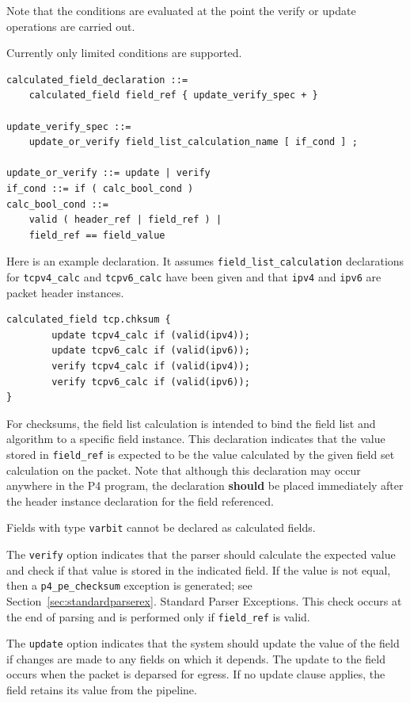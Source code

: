 \documentclass[12pt]{article}
\begin{document}
Note that the conditions are evaluated at the point the verify or
update operations are carried out.

Currently only limited conditions are supported.

\begin{lstlisting}[style=BNFstyle]
calculated_field_declaration ::=
    calculated_field field_ref { update_verify_spec + }

update_verify_spec ::=
    update_or_verify field_list_calculation_name [ if_cond ] ;

update_or_verify ::= update | verify
if_cond ::= if ( calc_bool_cond )
calc_bool_cond ::=
    valid ( header_ref | field_ref ) |
    field_ref == field_value
\end{lstlisting}

Here is an example declaration. It assumes \texttt{field_list_calculation} declarations 
for \texttt{tcpv4_calc} and \texttt{tcpv6_calc} have been given and that \texttt{ipv4} and \texttt{ipv6} are 
packet header instances.

\begin{lstlisting}[style=P4style]
calculated_field tcp.chksum {
        update tcpv4_calc if (valid(ipv4));
        update tcpv6_calc if (valid(ipv6));
        verify tcpv4_calc if (valid(ipv4));
        verify tcpv6_calc if (valid(ipv6));
}
\end{lstlisting}

For checksums, the field list calculation is intended to bind the field list 
and algorithm to a specific field instance. This declaration indicates that 
the value stored in \texttt{field_ref} is expected to be the value calculated by the 
given field set calculation on the packet. Note that although this declaration 
may occur anywhere in the P4 program, the declaration \textbf{should} be placed immediately 
after the header instance declaration for the field referenced.

Fields with type \texttt{varbit} cannot be declared as calculated fields.

The \texttt{verify} option indicates that the parser should calculate the expected 
value and check if that value is stored in the indicated field. If the value 
is not equal, then a \texttt{p4_pe_checksum} exception is generated; see Section~\ref{sec:standardparserex}. 
Standard Parser Exceptions. This check occurs at the end of parsing and is 
performed only if \texttt{field_ref} is valid.

The \texttt{update} option indicates that the system should update the value of the 
field if changes are made to any fields on which it depends. The update to 
the field occurs when the packet is deparsed for egress. If no update clause 
applies, the field retains its value from the \matchaction pipeline.
\end{document}
